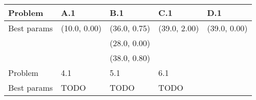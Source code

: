 \begin{tabular}{*{5}{C{40pt}}}
	\toprule
	Problem     & A.1          & B.1          & C.1          & D.1 \\
	\midrule
	Best params & (10.0, 0.00) & (36.0, 0.75) & (39.0, 2.00) & (39.0, 0.00) \\
	            &              & (28.0, 0.00) &              & \\
	            &              & (38.0, 0.80) &              & \\
	\midrule
	\midrule
	Problem     & 4.1          & 5.1          & 6.1          & \\
	\midrule
	Best params & TODO         & TODO         & TODO         & \\
	\bottomrule
\end{tabular}

